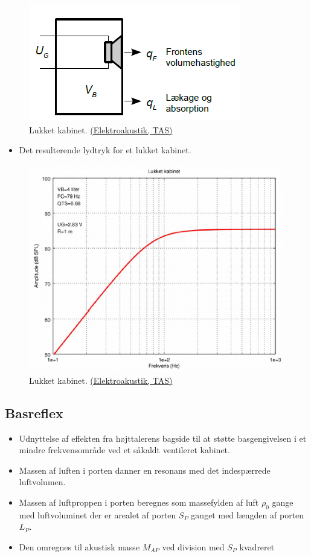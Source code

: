 \begin{figure} [H]
	\centering
	\includegraphics[width=0.5\linewidth]{graphics/59.png}
	\caption{Lukket kabinet. \href{http://www.torean.dk/artikel/Elektroakustik.pdf}{(Elektroakustik, TAS)}}
	\label{fig:59}
\end{figure}
\begin{itemize}
	\item Det resulterende lydtryk for et lukket kabinet.
\end{itemize}
\begin{figure} [H]
	\centering
	\includegraphics[width=0.75\linewidth]{graphics/58.png}
	\caption{Lukket kabinet. \href{http://www.torean.dk/artikel/Elektroakustik.pdf}{(Elektroakustik, TAS)}}
	\label{fig:58}
\end{figure}


\subsection{Basreflex}
\begin{itemize}
	\item Udnyttelse af effekten fra højttalerens bagside til at støtte basgengivelsen i et mindre frekvensområde ved et såkaldt ventileret kabinet.
	\item Massen af luften i porten danner en resonans	med det indespærrede luftvolumen.
	\item Massen af luftproppen i porten beregnes som massefylden af luft $\rho_0$ gange med luftvoluminet der er arealet af porten $S_P$ ganget med længden af porten $L_P$.
	\item Den omregnes til akustisk masse $M_{AP}$ ved division med $S_P$ kvadreret
\end{itemize}

